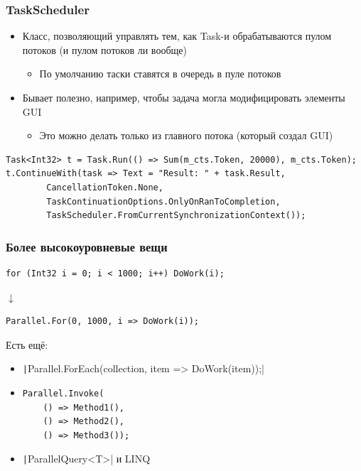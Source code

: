 \documentclass[xetex,mathserif,serif]{beamer}
\newcommand{\DownArrow} {
	\hspace{2cm}\begin{LARGE}$\downarrow$\end{LARGE}
}
\begin{document}
	\begin{frame}[fragile]
		\frametitle{TaskScheduler}
		\begin{itemize}
			\item Класс, позволяющий управлять тем, как Task-и обрабатываются пулом потоков (и пулом потоков ли вообще)
			\begin{itemize}
				\item По умолчанию таски ставятся в очередь в пуле потоков
			\end{itemize}
			\item Бывает полезно, например, чтобы задача могла модифицировать элементы GUI
			\begin{itemize}
				\item Это можно делать только из главного потока (который создал GUI)
			\end{itemize}
		\end{itemize}

		\begin{small}
			\begin{verbatim}
Task<Int32> t = Task.Run(() => Sum(m_cts.Token, 20000), m_cts.Token);
t.ContinueWith(task => Text = "Result: " + task.Result,
        CancellationToken.None,
        TaskContinuationOptions.OnlyOnRanToCompletion,
        TaskScheduler.FromCurrentSynchronizationContext());
			\end{verbatim}
		\end{small}
	\end{frame}

	\begin{frame}[fragile]
		\frametitle{Более высокоуровневые вещи}
		\begin{verbatim}
for (Int32 i = 0; i < 1000; i++) DoWork(i);
		\end{verbatim}
		\DownArrow
		\begin{verbatim}
Parallel.For(0, 1000, i => DoWork(i));
		\end{verbatim}

		Есть ещё:
		\begin{itemize}
			\item \texttt|Parallel.ForEach(collection, item => DoWork(item));|
			\item 
				\begin{verbatim}
Parallel.Invoke(
    () => Method1(),
    () => Method2(),
    () => Method3());
				\end{verbatim}
			\item \texttt|ParallelQuery<T>| и LINQ
		\end{itemize}
	\end{frame}
\end{document}
